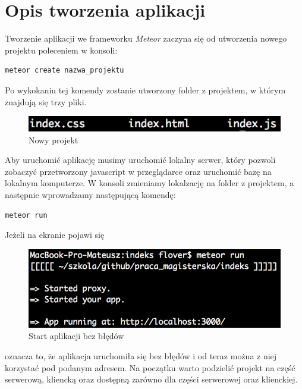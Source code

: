 \documentclass{xmgr}
\begin{document}
\section{Opis tworzenia aplikacji}
Tworzenie aplikacji we frameworku \textit{Meteor} zaczyna się od utworzenia nowego projektu poleceniem w konsoli:
\begin{lstlisting}[language=bash,caption={Tworzenie projektu}]
	meteor create nazwa_projektu
\end{lstlisting}

Po wykokaniu tej komendy zostanie utworzony folder z projektem, w którym znajdują się trzy pliki.

\begin{figure}[H]
\centering
\includegraphics[width=0.8\hsize]{images/newProject} 
\caption{Nowy projekt\label{RYS.15}}
\end{figure}

Aby uruchomić aplikację musimy uruchomić lokalny serwer, który pozwoli zobaczyć przetworzony javascript w przeglądarce oraz uruchomić bazę na lokalnym komputerze. W konsoli zmieniamy lokalzację na folder z projektem, a następnie wprowadzamy następującą komendę:

\begin{lstlisting}[language=bash,caption={Uruchomienie aplikacji}]
	meteor run
\end{lstlisting}

Jeżeli na ekranie pojawi się

\begin{figure}[th!]
\centering
\includegraphics[width=0.8\hsize]{images/succesfullStart} 
\caption{Start aplikacji bez błędów\label{RYS.16}}
\end{figure}

oznacza to, że aplikacja uruchomiła się bez błędów i od teraz można z niej korzystać pod podanym adresem. Na początku warto podzielić projekt na część serwerową, kliencką oraz dostępną zarówno dla części serwerowej oraz klienckiej. 
\end{document}
